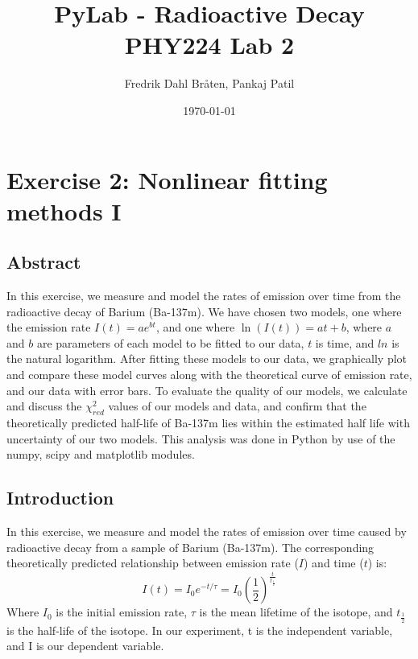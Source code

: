 \documentclass[letterpaper,12pt]{article}
\begin{document}
\title{%
PyLab - Radioactive Decay \\
\large PHY224 Lab 2}
\author{Fredrik Dahl Bråten, Pankaj Patil}
\date{\today}
\maketitle

\section{Exercise 2:  Nonlinear fitting methods I}

\subsection{Abstract}

In this exercise, we measure and model the rates of emission over time from the radioactive decay of Barium (Ba-137m). 
We have chosen two models, one where the emission rate $I(t) = ae^{bt}$, and one where $\ln(I(t)) = at+b$, 
where $a$ and $b$ are parameters of each model to be fitted to our data, 
$t$ is time, and $ln$ is the natural logarithm. 
After fitting these models to our data, we graphically plot and 
compare these model curves along with the theoretical curve of emission rate, and our data with error bars. 
To evaluate the quality of our models, we calculate and discuss the $\chi^2_{red}$ values of our models and data, 
and confirm that the theoretically predicted half-life of Ba-137m lies within the estimated half life with 
uncertainty of our two models. 
This analysis was done in Python by use of the numpy, scipy and matplotlib modules.

\subsection{Introduction}

In this exercise, we measure and model the rates of emission over time caused 
by radioactive decay from a sample of Barium (Ba-137m). 
The corresponding theoretically predicted relationship between emission 
rate ($I$) and time ($t$) is:
$$I(t) = I_0e^{-t/\tau} = I_0 (\frac{1}{2})^{\frac{t}{t_{\frac{1}{2}}}}$$ 
Where $I_0$ is the initial emission rate, $\tau$ is the mean lifetime of the 
isotope, and $t_{\frac{1}{2}}$ is the half-life of the isotope. 
In our experiment, t is the independent variable, and I is our dependent variable.
\end{document}
